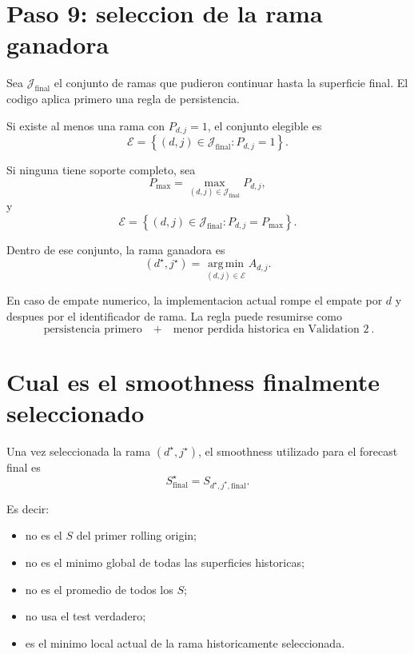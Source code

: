 \documentclass[11pt]{article}
\newcommand{\argmin}{\operatorname*{arg\,min}}
\begin{document}
\section{Paso 9: seleccion de la rama ganadora}

Sea \(\mathcal{J}_{\mathrm{final}}\) el conjunto de ramas que pudieron continuar
hasta la superficie final. El codigo aplica primero una regla de persistencia.

Si existe al menos una rama con \(P_{d,j}=1\), el conjunto elegible es
\begin{equation}
\mathcal{E}
=
\left\{
(d,j)\in\mathcal{J}_{\mathrm{final}}:
P_{d,j}=1
\right\}.
\label{eq:eligible1}
\end{equation}

Si ninguna tiene soporte completo, sea
\[
P_{\max}
=
\max_{(d,j)\in\mathcal{J}_{\mathrm{final}}}P_{d,j},
\]
y
\begin{equation}
\mathcal{E}
=
\left\{
(d,j)\in\mathcal{J}_{\mathrm{final}}:
P_{d,j}=P_{\max}
\right\}.
\label{eq:eligible2}
\end{equation}

Dentro de ese conjunto, la rama ganadora es
\begin{equation}
(d^\star,j^\star)
=
\argmin_{(d,j)\in\mathcal{E}}
A_{d,j}.
\label{eq:winner}
\end{equation}

En caso de empate numerico, la implementacion actual rompe el empate por
\(d\) y despues por el identificador de rama. La regla puede resumirse como
\[
\boxed{
\text{persistencia primero}
\quad+\quad
\text{menor perdida historica en Validation 2}
}.
\]

\section{Cual es el smoothness finalmente seleccionado}

Una vez seleccionada la rama \((d^\star,j^\star)\), el smoothness utilizado para
el forecast final es
\begin{equation}
\boxed{
S_{\mathrm{final}}^\star
=
S_{d^\star,j^\star,\mathrm{final}}.
}
\label{eq:finalS}
\end{equation}

Es decir:
\begin{itemize}[leftmargin=2em]
    \item no es el \(S\) del primer rolling origin;
    \item no es el minimo global de todas las superficies historicas;
    \item no es el promedio de todos los \(S\);
    \item no usa el test verdadero;
    \item es el minimo local actual de la rama historicamente seleccionada.
\end{itemize}
\end{document}
